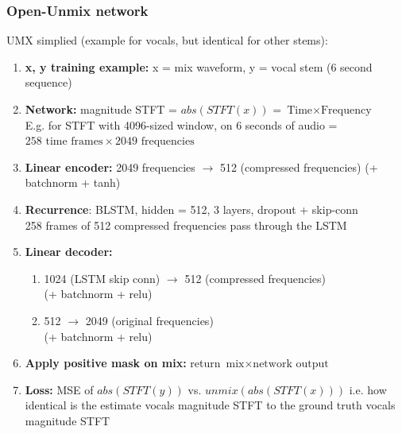 \documentclass[usenames,dvipsnames]{beamer}
\begin{document}
\begin{frame}
	\frametitle{Open-Unmix network}
	UMX simplied (example for vocals, but identical for other stems):
	\begin{enumerate}
		\item
			\textbf{x, y training example:} x = mix waveform, y = vocal stem (6 second sequence)
		\item
			\textbf{Network:} magnitude STFT = $abs(STFT(x))$ = $\text{Time} \times \text{Frequency}$\\E.g. for STFT with 4096-sized window, on 6 seconds of audio = $258 \text{ time frames} \times 2049 \text{ frequencies}$
		\item
			\textbf{Linear encoder:} 2049 frequencies $\rightarrow$ 512 (compressed frequencies)
			(+ batchnorm + tanh)
		\item
			\textbf{Recurrence}: BLSTM, hidden = 512, 3 layers, dropout + skip-conn\\
			258 frames of 512 compressed frequencies pass through the LSTM
		\item
			\textbf{Linear decoder:}
			\begin{enumerate}
				\item
					1024 (LSTM skip conn) $\rightarrow$ 512 (compressed frequencies)\\(+ batchnorm + relu)
				\item
					512 $\rightarrow$ 2049 (original frequencies)\\(+ batchnorm + relu)
			\end{enumerate}
		\item
			\textbf{Apply positive mask on mix:} return $\text{mix} \times \text{network output}$
		\item
			\textbf{Loss:} MSE of $abs(STFT(y))$ vs. $unmix(abs(STFT(x)))$ i.e. how identical is the estimate vocals magnitude STFT to the ground truth vocals magnitude STFT
	\end{enumerate}
\end{frame}
\end{document}
